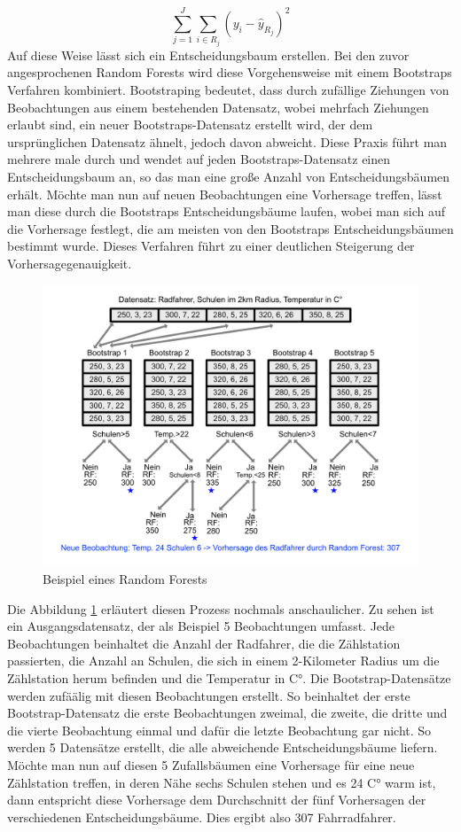 \documentclass[a4paper,12pt]{thesis}
\begin{document}
\begin{equation}
	\label{TDM:TreeOptimization}
	\sum_{j=1}^J\sum_{i\in R_j}(y_i - \hat{y}_{R_j})^2
\end{equation}
Auf diese Weise lässt sich ein Entscheidungsbaum erstellen. Bei den zuvor angesprochenen Random Forests wird diese Vorgehensweise mit einem Bootstraps Verfahren kombiniert. Bootstraping bedeutet, dass durch zufällige Ziehungen von Beobachtungen aus einem bestehenden Datensatz, wobei mehrfach Ziehungen erlaubt sind, ein neuer Bootstraps-Datensatz erstellt wird, der dem ursprünglichen Datensatz ähnelt, jedoch davon abweicht. Diese Praxis führt man mehrere male durch und wendet auf jeden Bootstraps-Datensatz einen Entscheidungsbaum an, so das man eine große Anzahl von Entscheidungsbäumen erhält. Möchte man nun auf neuen Beobachtungen eine Vorhersage treffen, lässt man diese durch die Bootstraps Entscheidungsbäume laufen, wobei man sich auf die Vorhersage festlegt, die am meisten von den Bootstraps Entscheidungsbäumen bestimmt wurde. Dieses Verfahren führt zu einer deutlichen Steigerung der Vorhersagegenauigkeit.

\begin{figure}[!ht]
	\centering
	\includegraphics[width=14cm]{Plots/Random_Forests.png}
	\caption{Beispiel eines Random Forests}
	\label{RF2}
\end{figure}

Die Abbildung \ref{RF2} erläutert diesen Prozess nochmals anschaulicher. Zu sehen ist ein Ausgangsdatensatz, der als Beispiel 5 Beobachtungen umfasst. Jede Beobachtungen beinhaltet die Anzahl der Radfahrer, die die Zählstation passierten, die Anzahl an Schulen, die sich in einem 2-Kilometer Radius um die Zählstation herum befinden und die Temperatur in C°. Die Bootstrap-Datensätze werden zufäälig mit diesen Beobachtungen erstellt. So beinhaltet der erste Bootstrap-Datensatz die erste Beobachtungen zweimal, die zweite, die dritte und die vierte Beobachtung einmal und dafür die letzte Beobachtung gar nicht. So werden 5 Datensätze erstellt, die alle abweichende Entscheidungsbäume liefern. Möchte man nun auf diesen 5 Zufallsbäumen eine Vorhersage für eine neue Zählstation treffen, in deren Nähe sechs Schulen stehen und es 24 C° warm ist, dann entspricht diese Vorhersage dem Durchschnitt der fünf Vorhersagen der verschiedenen Entscheidungsbäume. Dies ergibt also 307 Fahrradfahrer.
\end{document}
